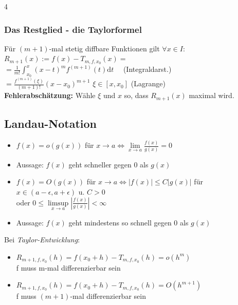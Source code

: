 \documentclass[6pt,a4paper]{scrartcl}
\newcommand{\abs}[1]{\ensuremath{\left\vert#1\right\vert}}
\begin{document}
\begin{multicols*}{4}
    \subsubsection{Das Restglied - die Taylorformel}
    Für $(m+1)$-mal stetig diffbare Funktionen gilt $\forall x \in I:$\\
    $R_{m+1}(x) := f(x)- T_{m,f,x_0}(x) =$  \\
    $= \frac{1}{m!} \int_{x_0}^{x}(x-t)^m f^{(m+1)}(t)\mathrm dt$ \ \  (Integraldarst.)\\
    $= \frac{f^{(m+1)}(\xi)}{(m+1)!}(x-x_0)^{m+1}$ \quad
    $\xi \in [x, x_0]$ (Lagrange) \\
    \textbf{Fehlerabschätzung:} Wähle $\xi$ und $x$ so, dass $R_{m+1}(x)$ maximal wird.

    \subsection{Landau-Notation}
    \begin{itemize}\itemsep-1pt
        \item $f(x) = o(g(x))$ für $x \rightarrow a \Leftrightarrow \lim\limits_{x \rightarrow a} \frac{f(x)}{g(x)} = 0$
        \item[-] Aussage: $f(x)$ geht schneller gegen $0$ als $g(x)$
        \item $f(x) = O(g(x))$ für $x \rightarrow a \Leftrightarrow |f(x)| \leq C|g(x)|$ für $x \in (a - \epsilon, a + \epsilon)$ u. $C > 0$\\ oder $0 \leq \limsup\limits_{x \rightarrow a} \abs{\frac{f(x)}{g(x)}} < \infty$
        \item[-] Aussage: $f(x)$ geht mindestens so schnell gegen $0$ als $g(x)$
    \end{itemize}
    Bei \emph{Taylor-Entwicklung}:
    \begin{itemize}\itemsep-1pt
        \item $R_{m+1,f,x_0}(h) = f(x_0 + h) - T_{m,f,x_0}(h) = o(h^m)$\\ f muss m-mal differenzierbar sein
        \item $R_{m+1,f,x_0}(h) = f(x_0 + h) - T_{m,f,x_0}(h) = O(h^{m+1})$\\ f muss $(m+1)$-mal differenzierbar sein
    \end{itemize}

\end{multicols*}
\end{document}
